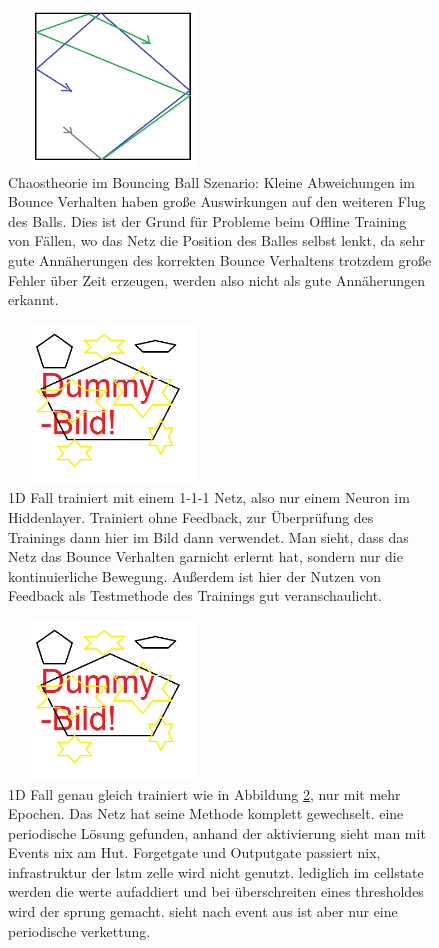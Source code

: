 \begin{figure}
	\centering
	\includegraphics[width=0.5\textwidth, height=160px]{pics/chaos.png}	
	\caption{Chaostheorie im Bouncing Ball Szenario: Kleine Abweichungen im Bounce Verhalten haben große Auswirkungen auf den weiteren Flug des Balls. Dies ist der Grund für Probleme beim Offline Training von Fällen, wo das Netz die Position des Balles selbst lenkt, da sehr gute Annäherungen des korrekten Bounce Verhaltens trotzdem große Fehler über Zeit erzeugen, werden also nicht als gute Annäherungen erkannt.}
	\label{img:chaos}
\end{figure}
\begin{figure}
	\centering
	\includegraphics[width=0.5\textwidth, height=160px]{pics/dummy.png}	
	\caption{1D Fall trainiert mit einem 1-1-1 Netz, also nur einem Neuron im Hiddenlayer. Trainiert ohne Feedback, zur Überprüfung des Trainings dann hier im Bild dann verwendet. Man sieht, dass das Netz das Bounce Verhalten garnicht erlernt hat, sondern nur die kontinuierliche Bewegung. Außerdem ist hier der Nutzen von Feedback als Testmethode des Trainings gut veranschaulicht.}
	 \label{img:1d1}
\end{figure}
\begin{figure}
	\centering
	\includegraphics[width=0.5\textwidth, height=160px]{pics/dummy.png}	
	\caption{1D Fall genau gleich trainiert wie in Abbildung \ref{img:1d1}, nur mit mehr Epochen. Das Netz hat seine Methode komplett gewechselt. eine periodische Lösung gefunden, anhand der aktivierung sieht man mit Events nix am Hut. Forgetgate und Outputgate passiert nix, infrastruktur der lstm zelle wird nicht genutzt. lediglich im cellstate werden die werte aufaddiert und bei überschreiten eines thresholdes wird der sprung gemacht. sieht nach event aus ist aber nur eine periodische verkettung.}
	\label{img:1d2}
\end{figure}
